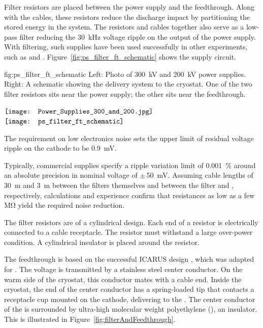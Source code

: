 Filter resistors are placed between the power supply and the feedthrough.  Along with the cables, these resistors reduce the discharge impact by partitioning the stored energy in the system.  The resistors and cables together also serve as a low-pass filter reducing 
the \SI{30}{kHz} voltage ripple on the output of the power supply.  With filtering, such supplies have been used successfully in other  experiments, such as  and . Figure~\ref{fig:ps_filter_ft_schematic} shows the  supply circuit.

\begin{dunefigure}  
{fig:ps_filter_ft_schematic}
{Left: Photo of \SI{300}{kV} and \SI{200}{kV} power supplies. %
Right:  A schematic showing the  delivery system to the cryostat. %
One of the two filter resistors sits near the power supply; the other sits near the feedthrough.}
\begin{minipage}{\textwidth}%
  \centering
 $\vcenter{\hbox{\texttt{[image: Power\_Supplies\_300\_and\_200.jpg]}}}$
 \hspace*{0.001\textwidth}  $\vcenter{\hbox{\texttt{[image: ps\_filter\_ft\_schematic]}}}$
\end{minipage}
\end{dunefigure}
The requirement  
on low electronics noise sets the upper limit of residual voltage ripple on the cathode to be \SI{0.9}{mV}. 

Typically, commercial supplies specify a ripple variation limit of 
\SI{.001}{\%} around an absolute precision in nominal voltage of $\pm\,$\SI{50}{mV}.
%
Assuming cable lengths of \SI{30}{m} and \SI{3}{m} between the filters themselves and between the filter and \fdth, respectively, calculations and experience confirm that resistances as low as a few \si{\mega\ohm} yield the required noise reduction. 

The %
filter resistors are of a cylindrical design. 
Each end of a  resistor is electrically connected to a cable receptacle. 
The resistor %
must withstand a large over-power condition.  A cylindrical insulator is placed around the resistor.

The  feedthrough %
is based on the successful ICARUS design \cite{Icarus-T600}, 
which was adapted for .  The voltage is transmitted by a stainless steel center conductor.  On the warm side of the cryostat, this conductor mates with a cable end.  Inside the cryostat, the end of the center conductor has a spring-loaded tip that %
contacts a receptacle cup mounted on the cathode, delivering  to the .  The center conductor of the \fdth is surrounded by ultra-high molecular weight polyethylene (), an insulator. This is illustrated in Figure~\ref{fig:filterAndFeedthrough}.

